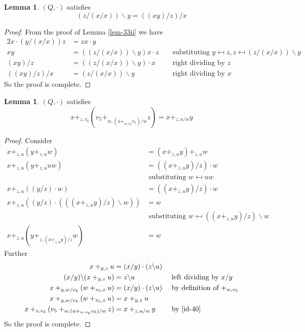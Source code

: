 \documentclass[12pt, twoside, openright]{report}
\theoremstyle{definition}
\newtheorem{lem}[thm]{Lemma}
\newcommand{\ldv}{\backslash}       %
\newcommand{\rdv}{/}                %
\begin{document}
\begin{lem}\label{lem-38}
  $(Q,\cdot)$ satisfies
  \[(z\rdv(x\rdv x))\ldv y = ((xy)\rdv z)\rdv x\]
\end{lem}

\begin{proof}
  From the proof of Lemma \ref{lem-33ii} we have
  \begin{alignat*}{2}
    x\cdot (y\rdv(x\rdv x))z &= zx\cdot y &&\\
    xy &= ((z\rdv(x\rdv x))\ldv y)x \cdot z &&\text{ substituting
      $y\mapsfrom z, z\mapsfrom (z\rdv(x\rdv x))\ldv y$}\\
    (xy)\rdv z &= ((z\rdv(x\rdv x))\ldv y)\cdot x &&\text{ right dividing by $z$}\\
    ((xy)\rdv z)\rdv x &= (z\rdv(x\rdv x))\ldv y &&\text{ right dividing by $x$}
  \end{alignat*}
  So the proof is complete.
\end{proof}

\begin{lem}\label{lem-42}
  $(Q, \cdot)$ satisfies
  \[x +_{z, v_6} (v_5 +_{w, (u +_{w, v_6} v_5)\rdv w} z) = x +_{z, u\rdv w} y\] 
\end{lem}

\begin{proof}
  Consider
  \begin{align*}
    x +_{z, u} (y +_{z, u} w) &= (x +_{z, u} y) +_{z, u} w\\
    x +_{z, u} (y +_{z, u} uw) &= ((x +_{z, u} y)\rdv z)\cdot w\\
      &\text{ substituting $w\mapsfrom uw$}\\
    x +_{z, u} ((y\rdv z)\cdot w) &= ((x +_{z, u} y)\rdv z)\cdot w\\
    x +_{z, u} ((y\rdv z) \cdot (((x +_{z, u} y)\rdv z)\ldv w)) &= w\\
      &\text{ substituting $w\mapsfrom ((x +_{z, u} y)\rdv z)\ldv w$}\\
    x +_{z, u} (y +_{z, (x +_{z, u} y)\rdv z} w) &= w \label{id-40} \tag{I}
  \end{align*}
  Further
  \begin{alignat*}{2}
    x +_{y, z} u &= (x\rdv y)\cdot (z\ldv u) &&\\
    (x\rdv y)\ldv(x +_{y, z} u) &= z\ldv u &&\text{ left dividing by $x\rdv y$}\\
    x +_{y, w\rdv v_5} (w +_{v_5, z} u) &= (x\rdv y)\cdot (z\ldv u)
      &&\text{ by definition of $+_{w, v_5}$}\\
    x +_{y, w\rdv v_5} (w +_{v_5, z} u) &= x +_{y, z} u &&\\
    x +_{z, v_6} (v_5 +_{w, (u +_{w, v_6} v_5)\rdv w} z) &= x +_{z, u\rdv w} y
      &&\text{ by \ref{id-40}}
  \end{alignat*}
  So the proof is complete.
\end{proof}
\end{document}
